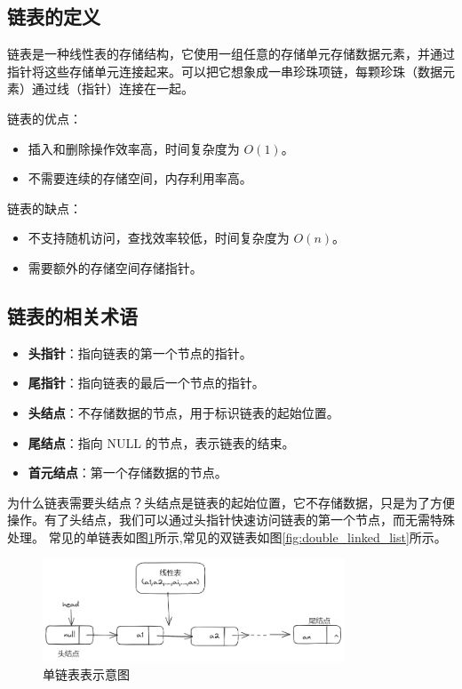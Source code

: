 \documentclass[lang=cn,newtx,10pt,scheme=chinese]{../elegantbook}
\begin{document}
\subsection{链表的定义}
链表是一种线性表的存储结构，它使用一组任意的存储单元存储数据元素，并通过指针将这些存储单元连接起来。可以把它想象成一串珍珠项链，每颗珍珠（数据元素）通过线（指针）连接在一起。

链表的优点：
\begin{itemize}
    \item 插入和删除操作效率高，时间复杂度为 $O(1)$。
    \item 不需要连续的存储空间，内存利用率高。
\end{itemize}

链表的缺点：
\begin{itemize}
    \item 不支持随机访问，查找效率较低，时间复杂度为 $O(n)$。
    \item 需要额外的存储空间存储指针。
\end{itemize}

\subsection{链表的相关术语}
\begin{itemize}
  \item \textbf{头指针}：指向链表的第一个节点的指针。
  \item \textbf{尾指针}：指向链表的最后一个节点的指针。
  \item \textbf{头结点}：不存储数据的节点，用于标识链表的起始位置。
  \item \textbf{尾结点}：指向 NULL 的节点，表示链表的结束。
  \item \textbf{首元结点}：第一个存储数据的节点。
\end{itemize}
为什么链表需要头结点？头结点是链表的起始位置，它不存储数据，只是为了方便操作。有了头结点，我们可以通过头指针快速访问链表的第一个节点，而无需特殊处理。
常见的单链表如图\ref{fig:single_linked_list}所示,常见的双链表如图\ref{fig:double_linked_list}所示。
\begin{figure}[h]
  \centering
  \includegraphics[width=0.8\textwidth]{./image/singleLink.png}
  \caption{单链表表示意图}
  \label{fig:single_linked_list}
\end{figure}
\end{document}
